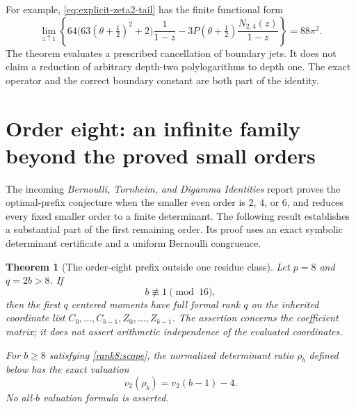 \documentclass[11pt,letterpaper]{article}
\newtheorem{theorem}{Theorem}[section]
\theoremstyle{definition}
\theoremstyle{remark}
\numberwithin{equation}{section}
\begin{document}
For example, \eqref{eq:explicit-zeta2-tail} has the finite functional
form
\begin{equation}\label{eq:explicit-boundary-operator}
 \lim_{z\uparrow1}
 \left\{64\bigl(63(\theta+\tfrac12)^2+2\bigr)\frac1{1-z}
       -3P(\theta+\tfrac12)\frac{N_{2,4}(z)}{1-z}\right\}
 =88\pi^2.
\end{equation}
The theorem evaluates a prescribed cancellation of boundary jets.
It does not claim a reduction of arbitrary depth-two polylogarithms
to depth one. The exact operator and the correct boundary constant
are both part of the identity.



\section{Order eight: an infinite family beyond the proved small orders}
\label{rank8:section}

The incoming \emph{Bernoulli, Tornheim, and Digamma Identities} report
\cite[general small-determinant reduction and research question R1]{incoming-bernoulli}
proves the optimal-prefix conjecture when the smaller even order is
$2$, $4$, or $6$, and reduces every fixed smaller order to a finite
determinant.  The following result establishes a substantial part of
the first remaining order.  Its proof uses an exact symbolic
determinant certificate and a uniform Bernoulli congruence.

\begin{theorem}[The order-eight prefix outside one residue class]
\label{rank8:theorem}
Let $p=8$ and $q=2b>8$.  If
\begin{equation}\label{rank8:scope}
 b\not\equiv1\pmod {16},
\end{equation}
then the first $q$ centered moments have full formal rank $q$ on
the inherited coordinate list
$C_0,\ldots,C_{b-1},Z_0,\ldots,Z_{b-1}$.
The assertion concerns the coefficient matrix; it does not assert
arithmetic independence of the evaluated coordinates.

For $b\ge8$ satisfying \eqref{rank8:scope}, the normalized determinant
ratio $\rho_b$ defined below has the exact valuation
\begin{equation}\label{rank8:valuation}
 v_2(\rho_b)=v_2(b-1)-4.
\end{equation}
No all-$b$ valuation formula is asserted.
\end{theorem}
\end{document}
